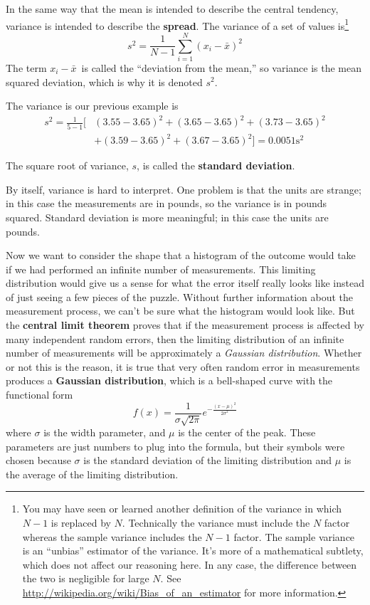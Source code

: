 In the same way that the mean is intended to describe the central
tendency, variance is intended to describe the {\bf spread}.
The variance of a set of values is\footnote{You may have seen or learned another definition of the variance in which $N-1$ is replaced by $N$. Technically the variance must include the $N$ factor whereas the sample variance includes the $N-1$ factor. The sample variance is an ``unbias'' estimator of the variance. It's more of a mathematical subtlety, which does not affect our reasoning here. In any case, the difference between the two is negligible for large $N$. See
\url{http://wikipedia.org/wiki/Bias_of_an_estimator} for more information.
 }
%
\[ s^2 = \frac{1}{N-1} \sum_{i=1}^N \left(x_i - \bar{x}\right)^2 \]
%
The term $x_i-\bar{x}$~is called the ``deviation from the mean,'' so
variance is the mean squared deviation, which is why it is denoted $s^2$.  


 
The variance is our previous example is
\begin{align*}
 s^2 =\frac{1}{5-1} [&(3.55-3.65)^2+ (3.65-3.65)^2+ (3.73-3.65)^2\\
 &+(3.59-3.65)^2+(3.67-3.65)^2 ] = 0.0051  \text{s}^2
\end{align*}




The square root of variance, $s$, is called the {\bf
  standard deviation}.


By itself, variance is hard to interpret.  One problem is that the
units are strange; in this case the measurements are in pounds, so the
variance is in pounds squared.  Standard deviation is more meaningful;
in this case the units are pounds.



Now we want to consider the shape that a histogram of the outcome would take if we had performed an infinite number of measurements. This limiting distribution would give us a sense for what the error itself really looks like instead of just seeing a few pieces of the puzzle. Without further information about the measurement process, we can't be sure what the histogram would look like. But the {\bf central limit theorem} proves that if the measurement process is affected by many independent random errors, then the limiting distribution of an infinite number of measurements will be approximately a {\it Gaussian distribution}. Whether or not this is the reason, it is true that very often random error in measurements produces a {\bf Gaussian distribution}, which is a bell-shaped curve with the functional form
\begin{equation} f(x) = \frac{1}{\sigma \sqrt{2 \pi}}  e^{-\frac{(x-\mu)^2}{2\sigma^2}}\end{equation}
where $\sigma$ is the width parameter, and $\mu$ is the center of the peak. These parameters are just numbers to plug into the formula, but their symbols were chosen because $\sigma$ is the standard deviation of the limiting distribution and $\mu$ is the average of the limiting distribution.

